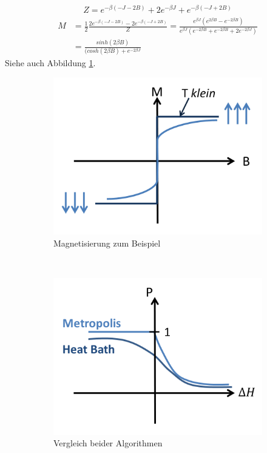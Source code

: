 \documentclass[12pt]{article}
\begin{document}
\begin{align*}
Z= e^{-\beta (-J -2B)} + 2 e^{-\beta J} + e^{- \beta (-J +2B)}
\end{align*}
\begin{align*}
 M &= \frac{1}{2} \frac{2 e^{-\beta (-J - 2B)} - 2 e^{-\beta (-J + 2B)}}{Z} = \frac{e^{\beta J} \left( e^{2 \beta B} - e^{-2\beta B} \right)}{e^{\beta J} \left( e^{-2\beta B} + e^{-2 \beta B} + 2 e^{-2 \beta J} \right)} \\
 &= \frac{sinh( 2 \beta B) }{(cosh(2 \beta B) + e^{-2 \beta J}}
\end{align*}
Siehe auch Abbildung \ref{fig:Magnetisierung}.

\begin{figure}[h] 
		\begin{subfigure}[h]{0.5 \textwidth}
		\centering
		\includegraphics[width=\textwidth]{Folie27.png}
		\caption{Magnetisierung zum Beispiel} 
		\label{fig:Magnetisierung}
		\centering
	\end{subfigure}
	~
\begin{subfigure}[h]{0.5\textwidth}
		\centering
		\includegraphics[width=\textwidth]{Folie28.png}
		\caption{Vergleich beider Algorithmen}
		\label{fig:MA_HB}
		\centering
	\end{subfigure}
	\caption{ }
\end{figure}	
\end{document}
